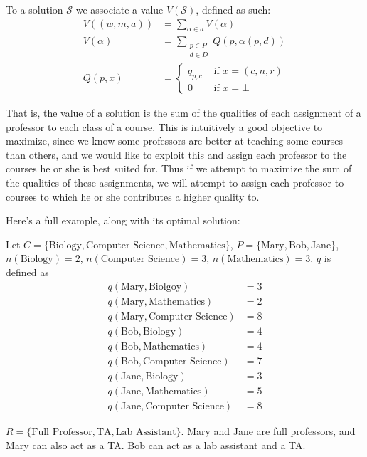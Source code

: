 To a solution $\mathcal{S}$ we associate a value $V(\mathcal{S})$, defined as such:
\begin{align*}
V((w, m, a)) &= \sum_{\alpha \in a} V(\alpha)\\
V(\alpha) &= \sum_{\substack{p \in P \\d \in D}} Q(p, \alpha(p, d))\\
Q(p, x) &= \begin{cases}
q_{p, c} & \text{ if } x = (c, n, r)\\
0 &\text{ if } x = \bot
\end{cases}
\end{align*}

That is, the value of a solution is the sum of the qualities of each assignment of a professor to each class of a course. This is intuitively a good objective to maximize, since we know some professors are better at teaching some courses than others, and we would like to exploit this and assign each professor to the courses he or she is best suited for. Thus if we attempt to maximize the sum of the qualities of these assignments, we will attempt to assign each professor to courses to which he or she contributes a higher quality to.

Here's a full example, along with its optimal solution:

Let $C = \{\text{Biology}, \text{Computer Science}, \text{Mathematics}\}$, $P = \{\text{Mary}, \text{Bob}, \text{Jane}\}$, $n(\text{Biology}) = 2$, $n(\text{Computer Science}) = 3$, $n(\text{Mathematics}) = 3$. $q$ is defined as
\begin{align*}
  q(\text{Mary}, \text{Biolgoy}) &= 3\\
  q(\text{Mary}, \text{Mathematics}) &= 2\\
  q(\text{Mary}, \text{Computer Science}) &= 8\\
  q(\text{Bob}, \text{Biology}) &= 4\\
  q(\text{Bob}, \text{Mathematics}) &= 4\\
  q(\text{Bob}, \text{Computer Science}) &= 7\\
  q(\text{Jane}, \text{Biology}) &= 3\\
  q(\text{Jane}, \text{Mathematics}) &= 5\\
  q(\text{Jane}, \text{Computer Science}) &= 8
\end{align*}

$R = \{\text{Full Professor}, \text{TA}, \text{Lab Assistant}\}$. Mary and Jane are full professors, and Mary can also act as a TA. Bob can act as a lab assistant and a TA.

